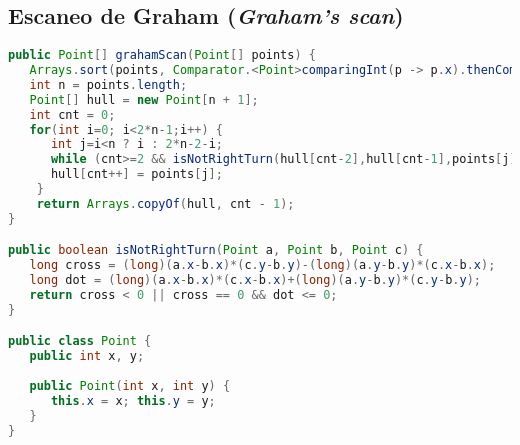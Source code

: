\subsection{Escaneo de Graham (\emph{Graham's scan})}
\begin{lstlisting}[language=Java]
public Point[] grahamScan(Point[] points) {
   Arrays.sort(points, Comparator.<Point>comparingInt(p -> p.x).thenComparingInt(p -> p.y));
   int n = points.length;
   Point[] hull = new Point[n + 1];
   int cnt = 0;
   for(int i=0; i<2*n-1;i++) {
      int j=i<n ? i : 2*n-2-i;
      while (cnt>=2 && isNotRightTurn(hull[cnt-2],hull[cnt-1],points[j])) --cnt;
      hull[cnt++] = points[j];
	}
	return Arrays.copyOf(hull, cnt - 1);
}

public boolean isNotRightTurn(Point a, Point b, Point c) {
   long cross = (long)(a.x-b.x)*(c.y-b.y)-(long)(a.y-b.y)*(c.x-b.x);
   long dot = (long)(a.x-b.x)*(c.x-b.x)+(long)(a.y-b.y)*(c.y-b.y);
   return cross < 0 || cross == 0 && dot <= 0;
}

public class Point {
   public int x, y;
   
   public Point(int x, int y) {
      this.x = x; this.y = y;
   }
}
\end{lstlisting}


